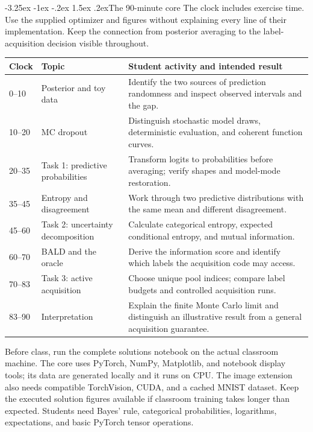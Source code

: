 \documentclass[11pt,a4paper]{article}
\makeatletter
\renewcommand\subsection{\@startsection{subsection}{2}{\z@}%
  {-3.25ex \@plus -1ex \@minus -.2ex}%
  {1.5ex \@plus .2ex}{\normalfont\large}}
\makeatother
\begin{document}
\subsection{The 90-minute core}
The clock includes exercise time. Use the supplied optimizer and figures
without explaining every line of their implementation. Keep the connection
from posterior averaging to the label-acquisition decision visible throughout.
\begin{center}
\begin{tabular}{@{}p{15mm}p{48mm}p{94mm}@{}}
\toprule
Clock & Topic & Student activity and intended result \\
\midrule
0--10 & Posterior and toy data & Identify the two sources of prediction
randomness and inspect observed intervals and the gap. \\
10--20 & MC dropout & Distinguish stochastic model draws, deterministic evaluation,
and coherent function curves. \\
20--35 & Task 1: predictive probabilities & Transform logits to probabilities
before averaging; verify shapes and model-mode restoration. \\
35--45 & Entropy and disagreement & Work through two predictive distributions
with the same mean and different disagreement. \\
45--60 & Task 2: uncertainty decomposition & Calculate categorical entropy,
expected conditional entropy, and mutual information. \\
60--70 & BALD and the oracle & Derive the information score and identify which
labels the acquisition code may access. \\
70--83 & Task 3: active acquisition & Choose unique pool indices; compare
label budgets and controlled acquisition runs. \\
83--90 & Interpretation & Explain the finite Monte Carlo limit and distinguish
an illustrative result from a general acquisition guarantee. \\
\bottomrule
\end{tabular}
\end{center}

Before class, run the complete solutions notebook on the actual classroom
machine. The core uses PyTorch, NumPy, Matplotlib, and notebook display tools;
its data are generated locally and it runs on CPU. The image extension also
needs compatible TorchVision, CUDA, and a cached MNIST dataset. Keep the
executed solution figures available if classroom training takes longer than
expected. Students need Bayes' rule, categorical probabilities, logarithms,
expectations, and basic PyTorch tensor operations.
\end{document}
